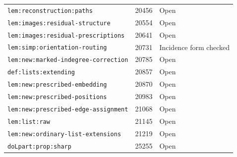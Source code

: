 \begin{longtable}{p{}r >{\raggedright\arraybackslash}p{}}
\nolinkurl{lem:reconstruction:paths} & 20456 & Open \\
\nolinkurl{lem:images:residual-structure} & 20554 & Open \\
\nolinkurl{lem:images:residual-prescriptions} & 20641 & Open \\
\nolinkurl{lem:simp:orientation-routing} & 20731 & Incidence form checked \\
\nolinkurl{lem:new:marked-indegree-correction} & 20785 & Open \\
\nolinkurl{def:lists:extending} & 20857 & Open \\
\nolinkurl{lem:new:prescribed-embedding} & 20870 & Open \\
\nolinkurl{lem:new:prescribed-positions} & 20983 & Open \\
\nolinkurl{lem:new:prescribed-edge-assignment} & 21068 & Open \\
\nolinkurl{lem:list:raw} & 21145 & Open \\
\nolinkurl{lem:new:ordinary-list-extensions} & 21219 & Open \\
\nolinkurl{doLpart:prop:sharp} & 25255 & Open \\
\bottomrule\end{longtable}
